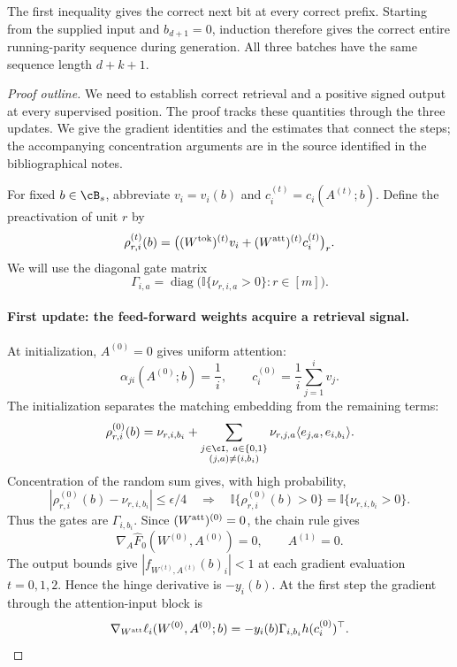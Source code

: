 \documentclass[11pt,twoside]{article}
\newcommand{\I}{\mathbb I}
\theoremstyle{definition}
\theoremstyle{remark}
\begin{document}
The first inequality gives the correct next bit at every correct prefix.
Starting from the supplied input and $b_{d+1}=0$, induction therefore gives
the correct entire running-parity sequence during generation. All three
batches have the same sequence length $d+k+1$.

\begin{proof}[Proof outline]
We need to establish correct retrieval and a positive signed output at every
supervised position. The proof tracks these quantities through the three
updates. We give the gradient identities and the estimates that connect the
steps; the accompanying concentration arguments are in the source identified
in the bibliographical notes.

For fixed $b\in\cB_s$, abbreviate $v_i=v_i(b)$ and
$c_i^{(t)}=c_i(A^{(t)};b)$. Define the preactivation of unit $r$ by
\[
\rho_{r,i}^{(t)}(b)
=\bigl((W^{\rm tok})^{(t)}v_i
       +(W^{\rm att})^{(t)}c_i^{(t)}\bigr)_r.
\]
We will use the diagonal gate matrix
\[
\Gamma_{i,a}=\operatorname{diag}
\bigl(\I\{\nu_{r,i,a}>0\}:r\in[m]\bigr).
\]

\paragraph{First update: the feed-forward weights acquire a retrieval signal.}
At initialization, $A^{(0)}=0$ gives uniform attention:
\[
\alpha_{ji}(A^{(0)};b)=\frac1i,
\qquad
c_i^{(0)}=\frac1i\sum_{j=1}^i v_j.
\]
The initialization separates the matching embedding from the remaining terms:
\[
\rho_{r,i}^{(0)}(b)
=\nu_{r,i,b_i}
+\sum_{\substack{j\in\cI,\ a\in\{0,1\}\\(j,a)\ne(i,b_i)}}
\nu_{r,j,a}\langle e_{j,a},e_{i,b_i}\rangle.
\]
Concentration of the random sum gives, with high probability,
\[
|\rho_{r,i}^{(0)}(b)-\nu_{r,i,b_i}|\le\epsilon/4
\quad\Longrightarrow\quad
\I\{\rho_{r,i}^{(0)}(b)>0\}=\I\{\nu_{r,i,b_i}>0\}.
\]
Thus the gates are $\Gamma_{i,b_i}$. Since $(W^{\rm att})^{(0)}=0$, the
chain rule gives
\[
\nabla_A\widehat F_0(W^{(0)},A^{(0)})=0,
\qquad A^{(1)}=0.
\]
The output bounds give $|f_{W^{(t)},A^{(t)}}(b)_i|<1$ at each gradient
evaluation $t=0,1,2$. Hence the hinge derivative is $-y_i(b)$. At the first
step the gradient through the attention-input block is
\begin{equation}
\nabla_{W^{\rm att}}\ell_i(W^{(0)},A^{(0)};b)
=-y_i(b)\Gamma_{i,b_i}h(c_i^{(0)})^\top.
\label{eq:transformer-first-gradient}
\end{equation}


\end{proof}
\end{document}
